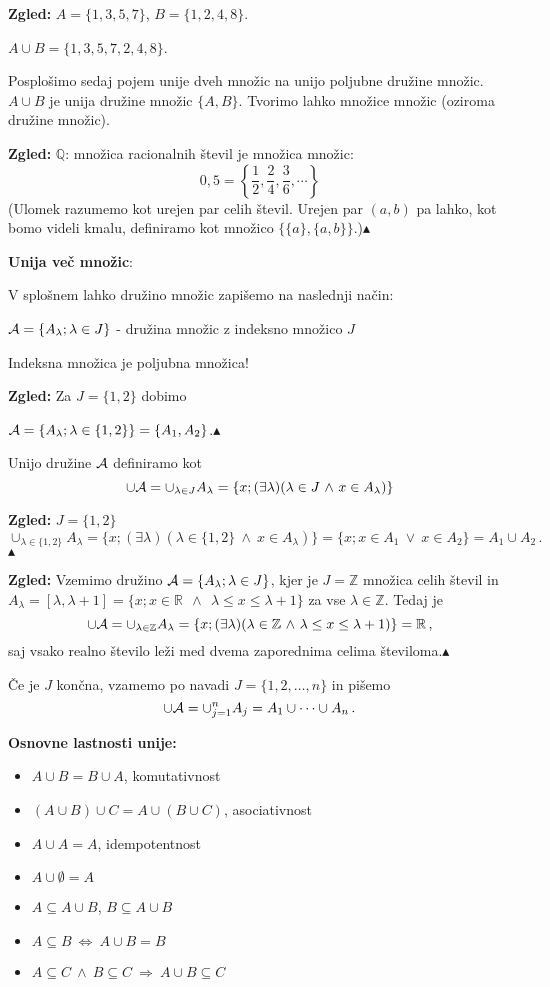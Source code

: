 \documentclass[11pt,paper=b5,footinclude,headinclude]{scrbook} %
\def\ali {{~\vee~}}
\def\inn {{~\wedge~}}
\def\sledi {{~\Rightarrow~}}
\def\cee {{~\Leftrightarrow~}}
\def\zgled{\noindent\textbf{\color{blue} Zgled: }}
\def\kz{{\hfill{\color{blue}$\blacktriangle$}}}%
\begin{document}
\textbf{ Zgled:}
$A = \{1,3,5,7\}$, $B = \{1,2,4,8\}$.

$A\cup B = \{1,3,5,7,2,4,8\}$.

\medskip
Posplošimo sedaj pojem unije dveh množic na unijo poljubne družine množic.
$A\cup B$ je unija družine množic $\{A,B\}$.
Tvorimo lahko množice množic (oziroma družine množic).

\zgled
$\mathbb{Q}$: množica racionalnih števil je množica množic:
$$0,5 = \left\{\frac{1}{2}, \frac{2}{4}, \frac{3}{6}, \cdots\right\}$$
(Ulomek razumemo kot urejen par celih števil. Urejen par $(a,b)$ pa lahko, kot bomo videli kmalu, definiramo kot množico $\{\{a\},\{a,b\}\}$.)\kz

\medskip

\textbf{ Unija več množic}:

V splošnem lahko družino množic zapišemo na naslednji način:

${\cal A} = \{A_\lambda; \lambda \in J\}$ - družina množic z indeksno množico $J$

Indeksna množica je poljubna množica!

\medskip
\zgled
Za $J = \{1,2\}$ dobimo

${\cal A} = \{A_\lambda; \lambda \in \{1,2\}\} = \{A_1,A_2\}$.\kz

\medskip
Unijo družine ${\cal A}$ definiramo kot
$$\cup {\cal A} = \cup_{\lambda \in J} A_\lambda = \{x;(\exists \lambda) (\lambda \in J\inn x\in A_\lambda)\}$$

\medskip
\zgled $J = \{1,2\}$
$$\cup_{\lambda \in \{1,2\}} A_\lambda = \{x;(\exists \lambda) (\lambda \in \{1,2\}\inn x\in A_\lambda)\}= \{x;x\in A_1 \ali x\in A_2\} = A_1\cup A_2\,.$$
\kz

\medskip
\zgled
Vzemimo družino
${\cal A} = \{A_\lambda; \lambda \in J\}$, kjer je $J = \mathbb{Z}$ množica celih števil
in $A_\lambda = [\lambda,\lambda+1] = \{x; x\in \mathbb{R}~\inn~\lambda\le x\le \lambda +1\}$ za vse $\lambda\in \mathbb{Z}$.
Tedaj je
$$\cup {\cal A} = \cup_{\lambda\in \mathbb{Z}}A_\lambda
= \{x;(\exists \lambda) (\lambda \in \mathbb{Z}\inn \lambda \le x\le \lambda +1)\} = \mathbb{R}\,,$$
saj vsako realno število leži med dvema zaporednima celima številoma.\kz

\medskip
Če je $J$ končna, vzamemo po navadi $J = \{1,2,\ldots, n\}$ in pišemo
$$\cup {\cal A} = \cup_{j = 1}^nA_j = A_1\cup\cdots\cup A_n\,.$$


\bigskip
\textbf{ Osnovne lastnosti unije:}
\begin{itemize}
  \item $A\cup B = B\cup A$, komutativnost
  \item $(A\cup B)\cup C = A\cup (B\cup C)$, asociativnost
  \item $A\cup A = A$, idempotentnost
  \item $A\cup \emptyset = A$
  \item $A\subseteq A\cup B$, $B\subseteq A\cup B$
  \item $A\subseteq B\cee A\cup B = B$
  \item $A\subseteq C\inn B\subseteq C\sledi A\cup B \subseteq C$
\end{itemize}
\end{document}
